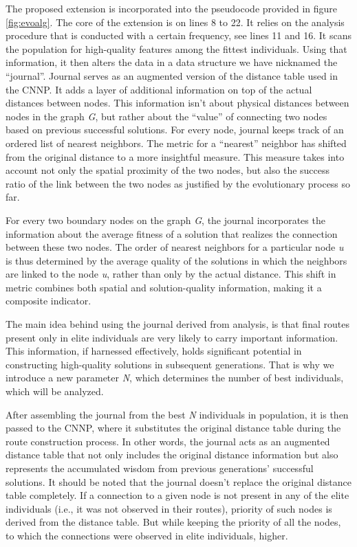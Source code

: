 \documentclass[twoside]{ctuthesis}
\theoremstyle{plain}
\theoremstyle{definition}
\theoremstyle{note}
\begin{document}
The proposed extension is incorporated into the pseudocode provided in figure \ref{fig:evoalg}. The core of the extension is on lines 8 to 22. It relies on the analysis procedure that is conducted with a certain frequency, see lines 11 and 16.
It scans the population for high-quality features among the fittest individuals. Using that information, it then alters the data in a data structure we have nicknamed the ``journal''. Journal serves as an augmented version of the distance table used in the CNNP. It adds a layer of additional information on top of the actual distances between nodes. This information isn't about physical distances between nodes in the graph \emph{G}, but rather about the ``value'' of connecting two nodes based on previous successful solutions. For every node, journal keeps track of an ordered list of nearest neighbors. The metric for a ``nearest'' neighbor has shifted from the original distance to a more insightful measure. This measure takes into account not only the spatial proximity of the two nodes, but also the success ratio of the link between the two nodes as justified by the evolutionary process so far.

For every two boundary nodes on the graph \emph{G}, the journal incorporates the information about the average fitness of a solution that realizes the connection between these two nodes. The order of nearest neighbors for a particular node \emph{u} is thus determined by the average quality of the solutions in which the neighbors are linked to the node \emph{u}, rather than only by the actual distance. This shift in metric combines both spatial and solution-quality information, making it a composite indicator.

The main idea behind using the journal derived from analysis, is that final routes present only in elite individuals are very likely to carry important information. This information, if harnessed effectively, holds significant potential in constructing high-quality solutions in subsequent generations.
That is why we introduce a new parameter \emph{N}, which determines the number of best individuals, which will be analyzed.


After assembling the journal from the best \emph{N} individuals in population, it is then passed to the CNNP, where it substitutes the original distance table during the route construction process. In other words, the journal acts as an augmented distance table that not only includes the original distance information but also represents the accumulated wisdom from previous generations' successful solutions. It should be noted that the journal doesn't replace the original distance table completely. 
If a connection to a given node is not present in any of the elite individuals (i.e., it was not observed in their routes), priority of such nodes is derived from the distance table. But while keeping the priority of all the nodes, to which the connections were observed in elite individuals, higher. 
\end{document}
